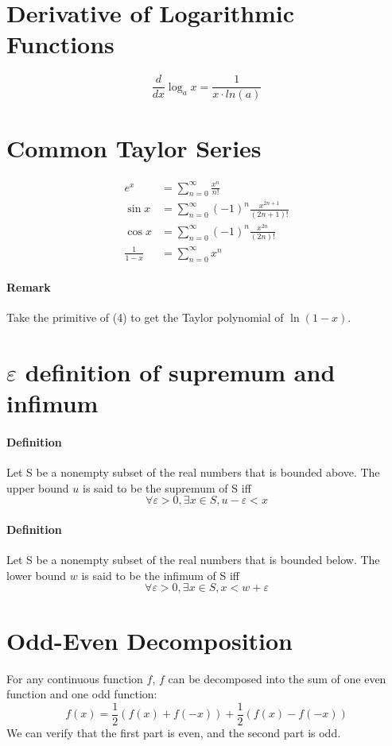 \documentclass[11pt]{article}
\begin{document}
\section{Derivative of Logarithmic Functions}
$$\frac{d}{dx}\log_a{x} = \frac{1}{x \cdot ln(a)}$$

\section{Common Taylor Series}
\begin{align}
	e^x &= \sum_{n=0}^{\infty}\frac{x^n}{n!}\\
	\sin{x} &= \sum_{n=0}^{\infty}(-1)^n\frac{x^{2n+1}}{(2n+1)!}\\
	\cos{x} &= \sum_{n=0}^{\infty}(-1)^n\frac{x^{2n}}{(2n)!}\\
	\frac{1}{1-x} &= \sum_{n=0}^{\infty}x^n
\end{align}
\paragraph{Remark}
Take the primitive of (4) to get the Taylor polynomial of $\ln(1-x)$.
\section{$\varepsilon$ definition of supremum and infimum}
\paragraph{Definition} Let S be a nonempty subset of the real numbers that is bounded above. The upper bound $u$ is said to be the supremum of S iff $$\forall \varepsilon >0, \exists x \in S, u - \varepsilon < x$$
\paragraph{Definition} Let S be a nonempty subset of the real numbers that is bounded below. The lower bound $w$ is said to be the infimum of S iff $$\forall \varepsilon >0, \exists x \in S, x < w + \varepsilon$$
\section{Odd-Even Decomposition}
For any continuous function $f$, $f$ can be decomposed into the sum of one even function and one odd function:
$$f(x) = \frac{1}{2}(f(x) + f(-x)) + \frac{1}{2}(f(x) - f(-x))$$
We can verify that the first part is even, and the second part is odd.
\end{document}
